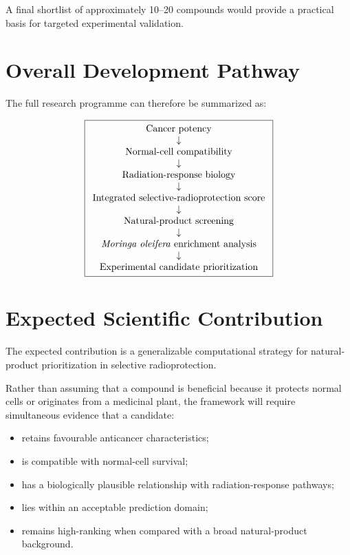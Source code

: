 \documentclass[11pt,a4paper]{article}
\begin{document}
A final shortlist of approximately 10--20 compounds would provide a practical basis for targeted experimental validation.

\section{Overall Development Pathway}

The full research programme can therefore be summarized as:

\[
\boxed{
\begin{array}{c}
\text{Cancer potency}\\
\downarrow\\
\text{Normal-cell compatibility}\\
\downarrow\\
\text{Radiation-response biology}\\
\downarrow\\
\text{Integrated selective-radioprotection score}\\
\downarrow\\
\text{Natural-product screening}\\
\downarrow\\
\text{\textit{Moringa oleifera} enrichment analysis}\\
\downarrow\\
\text{Experimental candidate prioritization}
\end{array}
}
\]

\section{Expected Scientific Contribution}

The expected contribution is a generalizable computational strategy for natural-product prioritization in selective radioprotection.

Rather than assuming that a compound is beneficial because it protects normal cells or originates from a medicinal plant, the framework will require simultaneous evidence that a candidate:

\begin{itemize}[leftmargin=1.6em]
    \item retains favourable anticancer characteristics;
    \item is compatible with normal-cell survival;
    \item has a biologically plausible relationship with radiation-response pathways;
    \item lies within an acceptable prediction domain;
    \item remains high-ranking when compared with a broad natural-product background.
\end{itemize}
\end{document}
